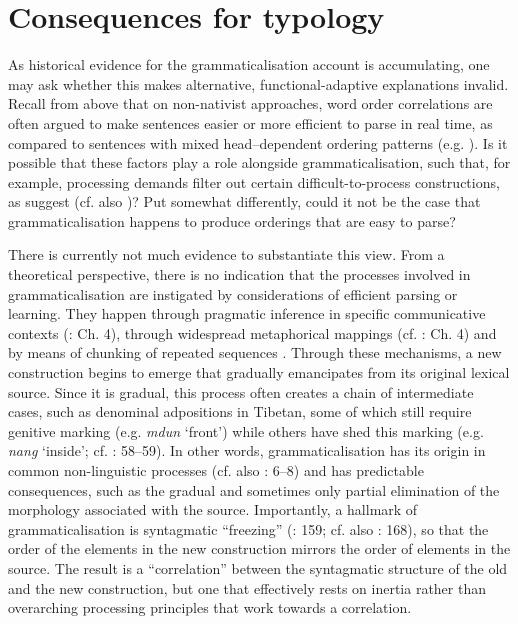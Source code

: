 \documentclass[output=paper]{langsci/langscibook}
\begin{document}
\section{Consequences for typology}\label{sec:collins:3}

As historical evidence for the grammaticalisation account is accumulating, one may ask whether this makes alternative, functional-adaptive explanations invalid. Recall from above that on non-nativist approaches, word order correlations are often argued to make sentences easier or more efficient to parse in real time, as compared to sentences with mixed head–dependent ordering patterns (e.g. \citealt{Hawkins2004}). Is it possible that these factors play a role alongside grammaticalisation, such that, for example, processing demands filter out certain difficult-to-process constructions, as \citet{KirbyHurford1997} suggest (cf. also \citealt{Christiansen2000})? Put somewhat differently, could it not be the case that grammaticalisation happens to produce orderings that are easy to parse?

There is currently not much evidence to substantiate this view. From a theoretical perspective, there is no indication that the processes involved in grammaticalisation are instigated by considerations of efficient parsing or learning. They happen through pragmatic inference in specific communicative contexts (\citealt{HopperTraugott2003}: Ch. 4), through widespread metaphorical mappings (cf. \citealt{Deutscher2005}: Ch. 4) and by means of chunking of repeated sequences \citep{Bybee2002}. Through these mechanisms, a new construction begins to emerge that gradually emancipates from its original lexical source. Since it is gradual, this process often creates a chain of intermediate cases, such as denominal adpositions in Tibetan, some of which still require genitive marking (e.g. \textit{mdun} ‘front’) while others have shed this marking (e.g. \textit{nang} ‘inside’; cf. \citealt{DeLancey1997}: 58–59). In other words, grammaticalisation has its origin in common non-linguistic processes (cf. also \citealt{Bybee2010}: 6–8) and has predictable consequences, such as the gradual and sometimes only partial elimination of the morphology associated with the source. Importantly, a hallmark of grammaticalisation is syntagmatic “freezing” (\citealt{Croft2000}: 159; cf. also \citealt{Lehmann2015}: 168), so that the order of the elements in the new construction mirrors the order of elements in the source. The result is a “correlation” between the syntagmatic structure of the old and the new construction, but one that effectively rests on inertia rather than overarching processing principles that work towards a correlation.
\end{document}

